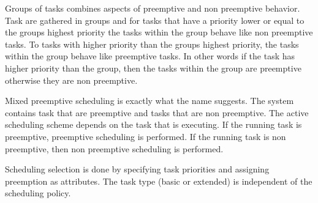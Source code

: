 Groups of tasks combines aspects of preemptive and non preemptive behavior. Task are gathered in groups and for tasks that have a priority lower or equal to the groups highest priority the tasks within the group behave like non preemptive tasks. To tasks with higher priority than the groups highest priority, the tasks within the group behave like preemptive tasks. In other words if the task has higher priority than the group, then the tasks within the group are preemptive otherwise they are non preemptive.

Mixed preemptive scheduling is exactly what the name suggests. The system contains task that are preemptive and tasks that are non preemptive. The active scheduling scheme depends on the task that is executing. If the running task is preemptive, preemptive scheduling is performed. If the running task is non preemptive, then non preemptive scheduling is performed. 

Scheduling selection is done by specifying task priorities and assigning preemption as attributes. The task type (basic or extended) is independent of the scheduling policy. 
